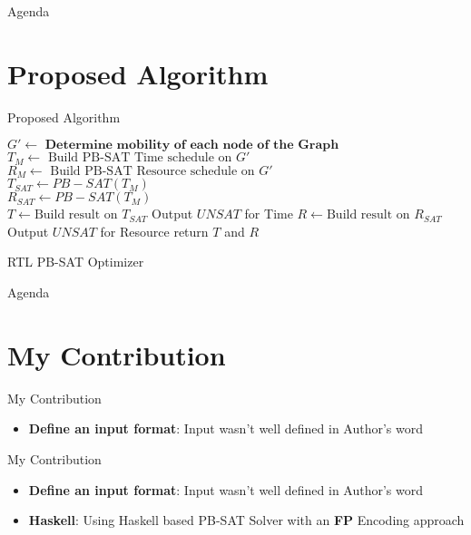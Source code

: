 \documentclass{beamer}
\begin{document}
 \begin{frame}{Agenda}
  \section{Proposed Algorithm}
  \tableofcontents[currentsection]
\end{frame}

\begin{frame}[fragile]{Proposed Algorithm}
  \begin{algorithm}[H]
    $G' \leftarrow \textbf{ Determine mobility of each node of the Graph}$\\
    $T_M \leftarrow \text{ Build PB-SAT Time schedule on } G'$\\
    $R_M \leftarrow \text{ Build PB-SAT Resource schedule on } G'$\\
    $T_{SAT} \leftarrow PB-SAT(T_M)$\\
    $R_{SAT} \leftarrow PB-SAT(T_M)$\\
    {$T \leftarrow \text{Build result on } T_{SAT}$}
    {Output $UNSAT$ for Time}
    {$R \leftarrow \text{Build result on } R_{SAT}$}
    {Output $UNSAT$ for Resource}
    return $T$ and $R$
   \caption{RTL PB-SAT Optimizer}
  \end{algorithm}
\end{frame}
 
\begin{frame}{Agenda}
  \section{My Contribution}
  \tableofcontents[currentsection]
\end{frame}

\begin{frame}[fragile]{My Contribution}
  \begin{block}{}
    \begin{itemize}
      \item \textbf{Define an input format}: Input wasn't well defined in Author's word
    \end{itemize}
  \end{block}
\end{frame}

\begin{frame}[fragile]{My Contribution}
  \begin{block}{}
    \begin{itemize}
      \item \textbf{Define an input format}: Input wasn't well defined in Author's word
      \item \textbf{Haskell}: Using Haskell based PB-SAT Solver with an \textbf{FP} Encoding approach
    \end{itemize}
  \end{block}
\end{frame}
\end{document}
